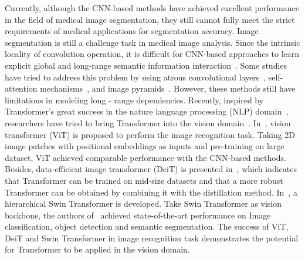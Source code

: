 \documentclass[runningheads]{llncs}
\begin{document}
Currently, although the CNN-based methods have achieved excellent performance in the field of medical image segmentation, they still cannot fully meet the strict requirements of medical applications for segmentation accuracy. Image segmentation is still a challenge task in medical image analysis. Since the intrinsic locality of convolution operation, it is difficult for CNN-based approaches to learn explicit global and long-range semantic information interaction~\cite{trans-unet}. Some studies have tried to address this problem by using atrous convolutional layers~\cite{deeplab,cenet}, self-attention mechanisms~\cite{att-gate,nonlocal}, and image pyramids~\cite{pyramid}. However, these methods still have limitations in modeling long - range dependencies. Recently, inspired by Transformer's great success in the nature language processing (NLP) domain~\cite{transformer}, researchers have tried to bring Transformer into the vision domain~\cite{detr}. In~\cite{vit}, vision transformer (ViT) is proposed to perform the image recognition task. Taking 2D image patches with positional embeddings as inputs and pre-training on large dataset, ViT achieved comparable performance with the CNN-based methods. Besides, data-efficient image transformer (DeiT) is presented in~\cite{deit}, which indicates that Transformer can be trained on mid-size datasets and that a more robust Transformer can be obtained by combining it with the distillation method. In~\cite{swin}, a hierarchical Swin Transformer is developed. Take Swin Transformer as vision backbone, the authors of~\cite{swin} achieved state-of-the-art performance on Image classification, object detection and semantic segmentation. The success of ViT, DeiT and Swin Transformer in image recognition task demonstrates the potential for Transformer to be applied in the vision domain.
\end{document}
